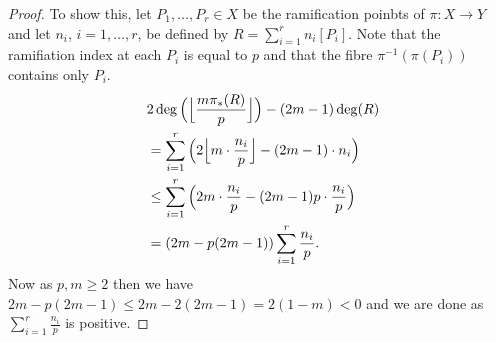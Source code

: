 \documentclass[11pt]{article} %
\begin{document}
\begin{proof}
	To show this, let $P_1,\ldots ,P_r\in X$ be the ramification poinbts of $\pi:X\rightarrow Y$ and let $n_i$, 
	$i=1,\ldots ,r$, be defined by $R=\sum_{i=1}^rn_i[P_i]$. Note that the ramifiation 
	index at each $P_i$ is equal to $p$ and that the fibre $\pi^{-1}(\pi(P_i))$ contains only $P_i$.
		\begin{eqnarray*}
			\lefteqn{2\deg\Big(\Big{\lfloor}\frac{m\pi_*(R)}{p}\Big{\rfloor}\Big)-(2m-1)\deg(R)}\\
			&=\sum_{i=1}^r\Big(2\Big{\lfloor}m\cdot \frac{n_i}{p}\Big{\rfloor}-(2m-1)\cdot n_i\Big) \\
			&\leq  \sum_{i=1}^r\Big(2m\cdot\frac{n_i}{p}-(2m-1)p\cdot\frac{n_i}{p}\Big) \\
			& =  (2m-p(2m-1))\sum_{i=1}^r\frac{n_i}{p}.
		\end{eqnarray*}
	Now as $p,m\geq 2$ then we have $2m-p(2m-1)\leq 2m-2(2m-1)=2(1-m)<0$ and we are done as 
	$\sum_{i=1}^r\frac{n_i}{p}$ is positive.
	
	
\end{proof}





\end{document}
